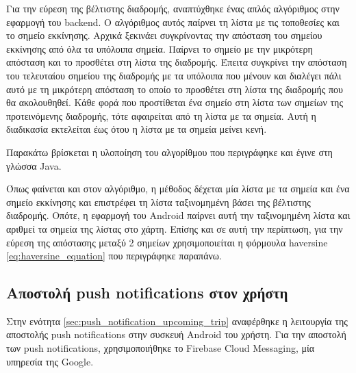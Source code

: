 \documentclass[oneside, 12pt]{book}
\begin{document}
Για την εύρεση της βέλτιστης διαδρομής, αναπτύχθηκε ένας απλός αλγόριθμος στην εφαρμογή του backend. Ο αλγόριθμος αυτός παίρνει τη λίστα με τις τοποθεσίες και το σημείο εκκίνησης. Αρχικά ξεκινάει συγκρίνοντας την απόσταση του σημείου εκκίνησης από όλα τα υπόλοιπα σημεία. Παίρνει το σημείο με την μικρότερη απόσταση και το προσθέτει στη λίστα της διαδρομής. Έπειτα συγκρίνει την απόσταση του τελευταίου σημείου της διαδρομής με τα υπόλοιπα που μένουν και διαλέγει πάλι αυτό με τη μικρότερη απόσταση το οποίο το προσθέτει στη λίστα της διαδρομής που θα ακολουθηθεί. Κάθε φορά που προστίθεται ένα σημείο στη λίστα των σημείων της προτεινόμενης διαδρομής, τότε αφαιρείται από τη λίστα με τα σημεία. Αυτή η διαδικασία εκτελείται έως ότου η λίστα με τα σημεία μείνει κενή.

Παρακάτω βρίσκεται η υλοποίηση του αλγορίθμου που περιγράφηκε και έγινε στη γλώσσα Java.


Όπως φαίνεται και στον αλγόριθμο, η μέθοδος δέχεται μία λίστα με τα σημεία και ένα σημείο εκκίνησης και επιστρέφει τη λίστα ταξινομημένη βάσει της βέλτιστης διαδρομής. Οπότε, η εφαρμογή του Android παίρνει αυτή την ταξινομημένη λίστα και αριθμεί τα σημεία της λίστας στο χάρτη.
Επίσης και σε αυτή την περίπτωση, για την εύρεση της απόστασης μεταξύ 2 σημείων χρησιμοποιείται η φόρμουλα haversine \ref{eq:haversine_equation} που περιγράφηκε παραπάνω.

\subsection{Αποστολή push notifications στον χρήστη}
Στην ενότητα \ref{sec:push_notification_upcoming_trip} αναφέρθηκε η 
λειτουργία της αποστολής push notifications στην συσκευή Android του 
χρήστη. Για την αποστολή των push notifications, χρησιμοποιήθηκε το 
Firebase Cloud Messaging, μία υπηρεσία της Google.
\end{document}
